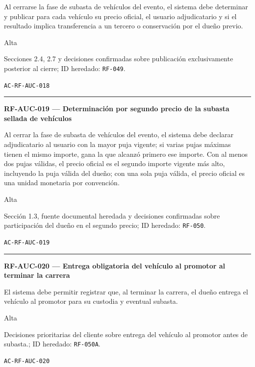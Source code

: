 \documentclass[10pt,letterpaper]{article}
\begin{document}
\begin{description}[style=nextline,leftmargin=3.15cm,labelwidth=2.8cm,font=\normalfont\bfseries]
\item[Obligación] Al cerrarse la fase de subasta de vehículos del evento, el sistema debe determinar y publicar para cada vehículo su precio oficial, el usuario adjudicatario y si el resultado implica transferencia a un tercero o conservación por el dueño previo.
\item[Prioridad] Alta
\item[Procedencia] Secciones 2.4, 2.7 y decisiones confirmadas sobre publicación exclusivamente posterior al cierre; ID heredado: \texttt{RF-049}.
\item[Verificación] \texttt{AC-RF-AUC-018}
\end{description}
\vspace{0.25em}\hrule\vspace{0.65em}
\noindent\textbf{RF-AUC-019 --- Determinación por segundo precio de la subasta sellada de vehículos}\par
\begin{description}[style=nextline,leftmargin=3.15cm,labelwidth=2.8cm,font=\normalfont\bfseries]
\item[Obligación] Al cerrar la fase de subasta de vehículos del evento, el sistema debe declarar adjudicatario al usuario con la mayor puja vigente; si varias pujas máximas tienen el mismo importe, gana la que alcanzó primero ese importe. Con al menos dos pujas válidas, el precio oficial es el segundo importe vigente más alto, incluyendo la puja válida del dueño; con una sola puja válida, el precio oficial es una unidad monetaria por convención.
\item[Prioridad] Alta
\item[Procedencia] Sección 1.3, fuente documental heredada y decisiones confirmadas sobre participación del dueño en el segundo precio; ID heredado: \texttt{RF-050}.
\item[Verificación] \texttt{AC-RF-AUC-019}
\end{description}
\vspace{0.25em}\hrule\vspace{0.65em}
\noindent\textbf{RF-AUC-020 --- Entrega obligatoria del vehículo al promotor al terminar la carrera}\par
\begin{description}[style=nextline,leftmargin=3.15cm,labelwidth=2.8cm,font=\normalfont\bfseries]
\item[Obligación] El sistema debe permitir registrar que, al terminar la carrera, el dueño entrega el vehículo al promotor para su custodia y eventual subasta.
\item[Prioridad] Alta
\item[Procedencia] Decisiones prioritarias del cliente sobre entrega del vehículo al promotor antes de subasta.; ID heredado: \texttt{RF-050A}.
\item[Verificación] \texttt{AC-RF-AUC-020}
\end{description}
\end{document}
